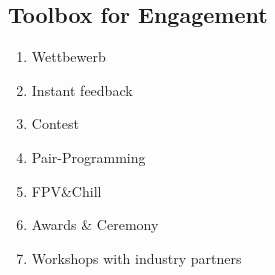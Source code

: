 \subsection{Toolbox for Engagement}

\begin{enumerate}
  \item Wettbewerb
  \item Instant feedback
  \item Contest
  \item Pair-Programming
  \item FPV\&Chill
  \item Awards \& Ceremony
  \item Workshops with industry partners
\end{enumerate}
